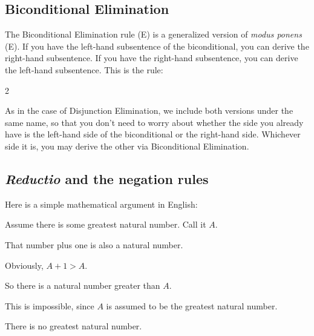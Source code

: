 \begin{ndproof}
	 
\end{ndproof}


\subsection{Biconditional Elimination}

The Biconditional Elimination rule ({\eiff}E) is a generalized version of \emph{modus ponens} ({\eif}E). If you have the left-hand subsentence of the biconditional, you can derive the right-hand subsentence. If you have the right-hand subsentence, you can derive the left-hand subsentence. This is the rule:



\begin{multicols}{2}
\begin{ndproof}
	\metaA{}
	\metaB{} 
\end{ndproof}
\begin{ndproof}
	\metaB{}
	\metaA{} 
\end{ndproof}
\end{multicols}

As in the case of Disjunction Elimination, we include both versions under the same name, so that you don't need to worry about whether the side you already have is the left-hand side of the biconditional or the right-hand side. Whichever side it is, you may derive the other via Biconditional Elimination.


\subsection{\emph{Reductio} and the negation rules}
Here is a simple mathematical argument in English:
\begin{earg}
\item[] Assume there is some greatest natural number. Call it $A$.
\item[] That number plus one is also a natural number.
\item[] Obviously, $A+1 > A$.
\item[] So there is a natural number greater than $A$.
\item[] This is impossible, since $A$ is assumed to be the greatest natural number.
\item[\therefore] There is no greatest natural number.
\end{earg}

